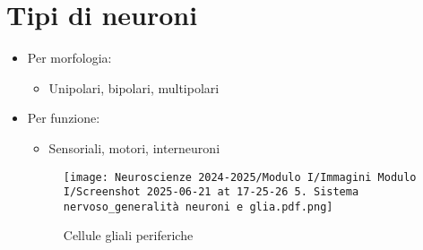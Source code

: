 \documentclass{article}
\begin{document}
\section{Tipi di neuroni}
\begin{itemize}
\item Per morfologia:
  \begin{itemize}
  \item Unipolari, bipolari, multipolari
  \end{itemize}
\item Per funzione:
  \begin{itemize}
  \item Sensoriali, motori, interneuroni
  \end{itemize}

\begin{figure}[h]
\centering
\texttt{[image: Neuroscienze 2024-2025/Modulo I/Immagini Modulo I/Screenshot 2025-06-21 at 17-25-26 5. Sistema nervoso\_generalità neuroni e glia.pdf.png]}
\caption{Cellule gliali periferiche}
\label{fig:tipi}
\end{figure}
\end{itemize}
\end{document}
